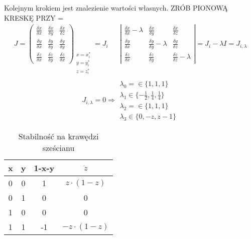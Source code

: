Kolejnym krokiem jest znalezienie wartości własnych.
{\color{red} ZRÓB PIONOWĄ KRESKĘ PRZY =}
\begin{align*}
J= \left(
\begin{array}{ccc}
\frac{\delta \dot{x}}{\delta x} & \frac{\delta \dot{x}}{\delta y} & \frac{\delta \dot{x}}{\delta z} \\
\frac{\delta \dot{y}}{\delta x} & \frac{\delta \dot{y}}{\delta y} & \frac{\delta \dot{y}}{\delta y} \\
\frac{\delta \dot{z}}{\delta x} & \frac{\delta \dot{z}}{\delta y} & \frac{\delta \dot{z}}{\delta x}
\end{array}
\right)_{
	\begin{array}{c}
		x=x^*_i\\
		y=y^*_i\\
		z=z^*_i\\	
	\end{array}	
} = J_i
&&
\left|
\begin{array}{ccc}
\frac{\delta \dot{x}}{\delta x}-\lambda & \frac{\delta \dot{x}}{\delta y} & \frac{\delta \dot{x}}{\delta z} \\
\frac{\delta \dot{y}}{\delta x} & \frac{\delta \dot{y}}{\delta y}-\lambda & \frac{\delta \dot{y}}{\delta z} \\
\frac{\delta \dot{z}}{\delta x} & \frac{\delta \dot{z}}{\delta y} & \frac{\delta \dot{z}}{\delta z}-\lambda
\end{array}
\right| = J_i - \lambda I = J_{i,\lambda} 
\end{align*}
\begin{equation*}
J_{i,\lambda} = 0 \Rightarrow 
\begin{array}{l}
\lambda_0 =\in \{1,1,1\}\\
\lambda_1 \in \{-\frac{1}{2}, \frac{1}{4}, \frac{1}{4}\}\\
\lambda_2 =\in \{1,1,1\}\\
\lambda_3 \in \{0,-z, z-1\}
\end{array}
\end{equation*}
\begin{wraptable}{rh}{0.35\textwidth}
    \centering
    \caption{Stabilność na krawędzi sześcianu}
\label{tab:krawedz_prawd}
\begin{tabular}{c|c|c|c}
x & y & 1-x-y & $\dot{z}$       \\ \hline 
0 & 0 & 1     & $z \cdot (1-z)$  \\
0 & 1 & 0     & 0                \\
1 & 0 & 0     & 0                \\
1 & 1 & -1    & $-z \cdot (1-z)$
\end{tabular}
\end{wraptable}
